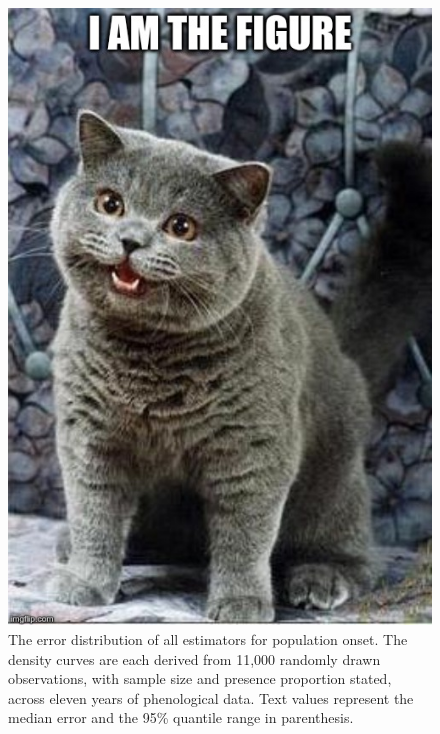 \begin{figure}
	\centering
		\includegraphics[scale=0.3]{images/figure_filler.jpg}
	\caption[The error distribution of all estimators for population onset]{The error distribution of all estimators for population onset. The density curves are each derived from 11,000 randomly drawn observations, with sample size and presence proportion stated, across eleven years of phenological data. Text values represent the median error and the 95\% quantile range in parenthesis.} \label{fig-3-1}
\end{figure}


